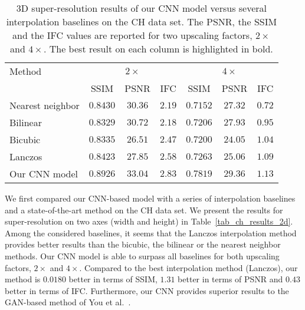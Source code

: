 \documentclass{ieeeaccess}
\begin{document}
\begin{table*}[!t]
\caption{3D super-resolution results of our CNN model versus several interpolation baselines on the CH data set. The PSNR, the SSIM and the IFC values are reported for two upscaling factors, $2\times$ and $4\times$. The best result on each column is highlighted in bold.}\label{tab_ch_results_3d}
\begin{center}
\begin{tabular}{|l|c|c|c|c|c|c|}
\hline 
Method & \multicolumn{3}{|c|}{$2\times$} & \multicolumn{3}{|c|}{$4\times$} \\
\cline{2-7}				& SSIM				& PSNR			& IFC           			& SSIM				& PSNR			& IFC\\
\hline  
\hline  
Nearest neighbor		& $0.8430$		& $30.36$	& $2.19$				& $0.7152$		& $27.32$	& $0.72$\\ 
\hline  
Bilinear						& $0.8329$		& $30.72$	&	$2.18$				& $0.7206$		& $27.93$ 	& $0.95$\\ 
\hline  
Bicubic						& $0.8335$		& $26.51$	&	$2.47$				& $0.7200$		& $24.05$ 	& $1.04$\\ 
\hline   
Lanczos					& $0.8423$		& $27.85$	&	$2.58$				& $0.7263$		& $25.06$	& $1.09$\\  
\hline 
Our CNN model		& $\mathbf{0.8926}$ & $\mathbf{33.04}$ & $\mathbf{2.83}$	& $\mathbf{0.7819}$ & $\mathbf{29.36}$ & $\mathbf{1.13}$\\ 
\hline 
\end{tabular}
\end{center}
\end{table*}

We first compared our CNN-based model with a series of interpolation baselines and a state-of-the-art method \cite{You-TMI-2019} on the CH data set. We present the results for super-resolution on two axes (width and height) in Table~\ref{tab_ch_results_2d}. Among the considered baselines, it seems that the Lanczos interpolation method provides better results than the bicubic, the bilinear or the nearest neighbor methods. Our CNN model is able to surpass all baselines for both upscaling factors, $2\times$ and $4\times$. Compared to the best interpolation method (Lanczos), our method is $0.0180$ better in terms of SSIM, $1.31$ better in terms of PSNR and $0.43$ better in terms of IFC. Furthermore, our CNN provides superior results to the GAN-based method of You et al.~\cite{You-TMI-2019}.
\end{document}
